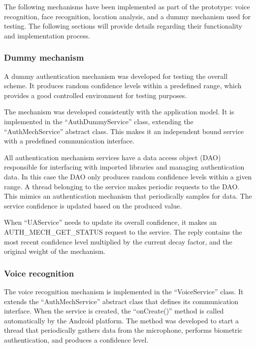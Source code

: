 The following mechanisms have been implemented as part of the prototype: voice recognition, face recognition, location analysis, and a dummy mechanism used for testing. The following sections will provide details regarding their functionality and implementation process.

\subsubsection{Dummy mechanism}
%
A dummy authentication mechanism was developed for testing the overall scheme. It produces random confidence levels within a predefined range, which provides a good controlled environment for testing purposes.

The mechanism was developed consistently with the application model. It is implemented in the ``AuthDummyService'' class, extending the ``AuthMechService'' abstract class. This makes it an independent bound service with a predefined communication interface.

All authentication mechanism services have a data access object (DAO) responsible for interfacing with imported libraries and managing authentication data. In this case the DAO only produces random confidence levels within a given range. A thread belonging to the service makes periodic requests to the DAO. This mimics an authentication mechanism that periodically samples for data. The service confidence is updated based on the produced value. 

When ``UAService'' needs to update its overall confidence, it makes an AUTH\_MECH\_GET\_STATUS request to the service. The reply contains the most recent confidence level multiplied by the current decay factor, and the original weight of the mechanism. 

\subsubsection{Voice recognition}
The voice recognition mechanism is implemented in the ``VoiceService'' class. It extends the ``AuthMechService'' abstract class that defines its communication interface. When the service is created, the ``onCreate()'' method is called automatically by the Android platform. The method was developed to start a thread that periodically gathers data from the microphone, performs biometric authentication, and produces a confidence level.

